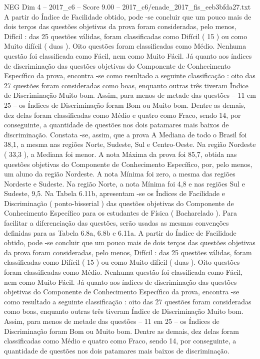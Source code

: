 \begin{textsample}{NEG Dim 4 – 2017\_c6 – Score 9.00 – 2017\_c6/enade\_2017\_fis\_eeb3bfda27.txt}
A partir do Índice de Facilidade obtido, pode -se concluir que um pouco mais de dois terços das questões objetivas da prova foram consideradas, pelo menos, Difícil : das 25 questões válidas, foram classificadas como Difícil ( 15 ) ou como Muito difícil ( duas ).
Oito questões foram classificadas como Médio.
Nenhuma questão foi classificada como Fácil, nem como Muito Fácil.
Já quanto aos índices de discriminação das questões objetivas do Componente de Conhecimento Específico da prova, encontra -se como resultado a seguinte classificação : oito das 27 questões foram consideradas como boas, enquanto outras três tiveram Índice de Discriminação Muito bom.
Assim, para menos de metade das questões – 11 em 25 – os Índices de Discriminação foram Bom ou Muito bom.
Dentre as demais, dez delas foram classificadas como Médio e quatro como Fraco, sendo 14, por conseguinte, a quantidade de questões nos dois patamares mais baixos de discriminação.
Constata -se, assim, que a prova A Mediana de todo o Brasil foi 38,1, a mesma nas regiões Norte, Sudeste, Sul e Centro-Oeste.
Na região Nordeste ( 33,3 ), a Mediana foi menor.
A nota Máxima da prova foi 85,7, obtida nas questões objetivas do Componente de Conhecimento Específico, por, pelo menos, um aluno da região Nordeste.
A nota Mínima foi zero, a mesma das regiões Nordeste e Sudeste.
Na região Norte, a nota Mínima foi 4,8 e nas regiões Sul e Sudeste, 9,5.
Na Tabela 6.11b, apresentam -se os Índices de Facilidade e Discriminação ( ponto-bisserial ) das questões objetivas do Componente de Conhecimento Específico para os estudantes de Física ( Bacharelado ).
Para facilitar a diferenciação das questões, serão usadas as mesmas convenções definidas para as Tabela 6.8a, 6.8b e 6.11a.
A partir do Índice de Facilidade obtido, pode -se concluir que um pouco mais de dois terços das questões objetivas da prova foram consideradas, pelo menos, Difícil : das 25 questões válidas, foram classificadas como Difícil ( 15 ) ou como Muito difícil ( duas ).
Oito questões foram classificadas como Médio.
Nenhuma questão foi classificada como Fácil, nem como Muito Fácil.
Já quanto aos índices de discriminação das questões objetivas do Componente de Conhecimento Específico da prova, encontra -se como resultado a seguinte classificação : oito das 27 questões foram consideradas como boas, enquanto outras três tiveram Índice de Discriminação Muito bom.
Assim, para menos de metade das questões – 11 em 25 – os Índices de Discriminação foram Bom ou Muito bom.
Dentre as demais, dez delas foram classificadas como Médio e quatro como Fraco, sendo 14, por conseguinte, a quantidade de questões nos dois patamares mais baixos de discriminação.

\end{textsample}
